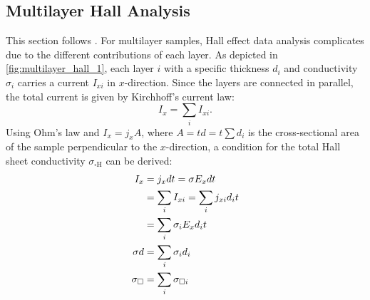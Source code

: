 \subsection{ Multilayer Hall Analysis}
This section follows .
For multilayer samples, Hall effect data analysis complicates due to the different
contributions of each layer.
As depicted in \cref{fig:multilayer_hall_1}, each layer $i$ with a specific thickness 
$d_i$ and conductivity $\sigma_i$ carries a current $I_{xi}$ in $x$-direction.
Since the layers are connected in parallel, the total current is 
given by Kirchhoff's current law:
\begin{equation}
	I_x = \sum_i I_{xi}.
\end{equation}
Using Ohm's law and $I_x=j_x A$, where $A=t d = t \sum d_i$ is the cross-sectional area of 
the sample perpendicular to the $x$-direction, a condition for the total Hall sheet 
conductivity $\sigma_\mathrm{\square H}$ can be derived:
\begin{align}
	I_{x}&=j_{x}dt=\sigma E_{x} dt \notag\\
	&=\sum_{i}I_{x i}=\sum_{i}j_{x i} d_{i}t \notag\\
	&=\sum_{i}\sigma_{i} E_{x}d_{i}t  \\
	\sigma d&=\sum_{i}\sigma_{i}d_{i} \\
	\sigma_{\mathrm{\square}}&=\sum_{i} \sigma_{\square i}
	\label{eq:multilayer_sum_1}
\end{align}

